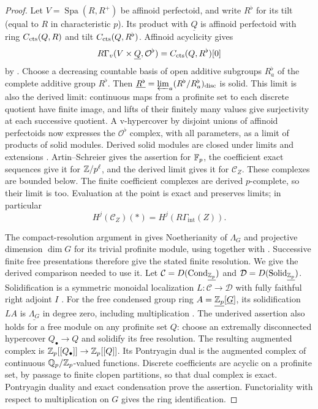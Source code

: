 \begin{proof}
Let $V=\operatorname{Spa}(R,R^+)$ be affinoid perfectoid, and write
$R^\flat$ for its tilt (equal to $R$ in characteristic $p$).
Its product with $\underline Q$ is affinoid perfectoid with ring
$C_{\mathrm{cts}}(Q,R)$ and tilt $C_{\mathrm{cts}}(Q,R^\flat)$.
Affinoid acyclicity gives
\[
 R\Gamma_v(V\times\underline Q,\mathcal O^\flat)
       =C_{\mathrm{cts}}(Q,R^\flat)[0]
\]
by \cite[Proposition~8.8]{ScholzeDiamonds}.  Choose a decreasing countable basis of
open additive subgroups $R^\flat_a$ of the complete additive group $R^\flat$.
Then $\underline{R^\flat}=\varprojlim_a(R^\flat/R^\flat_a)_{\mathrm{disc}}$ is solid.
This limit is also the derived limit: continuous maps from a
profinite set to each discrete quotient have finite image, and
lifts of their finitely many values give surjectivity at each
successive quotient.  A v-hypercover by disjoint unions of affinoid
perfectoids now expresses the $\mathcal O^\flat$ complex, with all
parameters, as a limit of products of solid modules.  Derived solid
modules are closed under limits and extensions
\cite[Theorem~4.4(ii)]{Tang}.  Artin--Schreier gives the assertion
for $\mathbb F_p$, the coefficient exact sequences give it for $\mathbb Z/p^\ell$,
and the derived limit gives it for $\mathscr C_Z$.  These complexes
are bounded below.  The finite coefficient complexes are derived
$p$-complete, so their limit is too.  Evaluation at the point is
exact and preserves limits; in particular
\[
 H^j(\mathscr C_Z)(*)=H^j(R\Gamma_{\mathrm{int}}(Z)).
\]

The compact-resolution argument in  gives
Noetherianity of $\Lambda_G$ and projective dimension $\dim G$ for
its trivial profinite module, using
\cite[Sections~1.1--1.2, pp.~275--276]{Venjakob} together with
\cite[Section~1, Corollary~(1)]{Serre1965CohomologicalDimension}.
Successive finite free presentations therefore give the stated
finite resolution.  We give the derived comparison needed to use
it.  Let $\mathcal C=D(\operatorname{Cond}_{\underline{\mathbb Z_p}})$
and $\mathcal D=D(\operatorname{Solid}_{\underline{\mathbb Z_p}})$.
Solidification is a symmetric monoidal localization
$L:\mathcal C\to\mathcal D$ with fully faithful right adjoint
$I$ \cite[Theorem~4.4(ii)]{Tang}.
For the free condensed group ring $A=\underline{\mathbb Z_p}[\underline G]$,
its solidification $LA$ is $\underline{\Lambda_G}$ in degree zero,
including multiplication \cite[Section~3.6 and the proof of
Theorem~4.4]{Tang}.
The underived assertion also holds for a free module on any
profinite set $Q$: choose an extremally disconnected hypercover
$Q_\bullet\to Q$ and solidify its free resolution.  The resulting
augmented complex is $\mathbb Z_p[[Q_\bullet]]\to\mathbb Z_p[[Q]]$.
Its Pontryagin dual is the augmented complex of continuous
$\mathbb Q_p/\mathbb Z_p$-valued functions.  Discrete coefficients are acyclic
on a profinite set, by passage to finite clopen partitions, so
that dual complex is exact.  Pontryagin duality and exact
condensation prove the assertion.  Functoriality with respect
to multiplication on $G$ gives the ring identification.


\end{proof}

